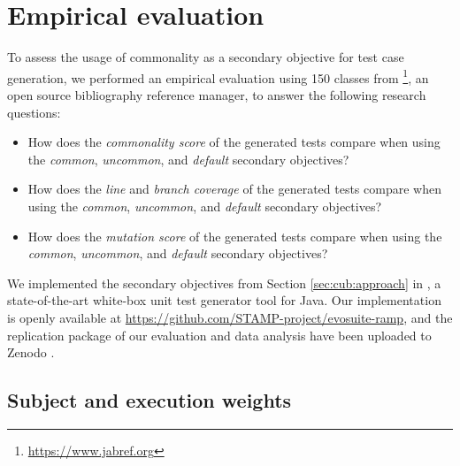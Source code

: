 
\section{Empirical evaluation}
\label{sec:cub:evaluation}

To assess the usage of commonality as a secondary objective for test case generation, we performed an empirical evaluation using 150 classes from \jabref\footnote{\url{https://www.jabref.org}}, an open source bibliography reference manager, to answer the following research questions:
%
\begin{itemize}
    \item[\textbf{RQ.1}] How does the \emph{commonality score} of the generated tests compare when using the \textit{common}, \textit{uncommon}, and \textit{default} secondary objectives?
    \item[\textbf{RQ.2}] How does the \emph{line} and \emph{branch coverage} of the generated tests  compare when using the \textit{common}, \textit{uncommon}, and \textit{default} secondary objectives?
    \item[\textbf{RQ.3}] How does the \emph{mutation score} of the generated tests  compare when using the \textit{common}, \textit{uncommon}, and \textit{default} secondary objectives? 
\end{itemize}

We implemented the secondary objectives from Section \ref{sec:cub:approach} in \evosuite \cite{Fraser2011}, a state-of-the-art white-box unit test generator tool for Java. Our implementation is openly available at \url{https://github.com/STAMP-project/evosuite-ramp}, and the replication package of our evaluation and data analysis have been uploaded to Zenodo \cite{evers_bjorn_2020_3897513, evers_bjorn_2020_3894711}. 

\subsection{Subject and execution weights}

